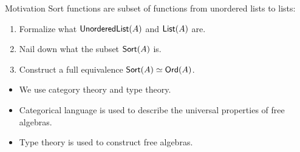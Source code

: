 \documentclass[9pt]{beamer}
\newcommand{\Ord}{\term{Ord}}
\newcommand{\setmtol}{\term{UL2L}}
\newcommand{\Sort}{\term{Sort}}
\newcommand{\otof}{\term{o2f}}
\newcommand{\List}{\term{List}}
\begin{document}
\begin{frame}{Motivation}
  Sort functions are subset of functions from unordered lists to lists:

  \begin{enumerate}
    \item Formalize what \alert{$\operatorname{\mathsf{UnorderedList}}(A)$} and \alert{$\List(A)$} are.
\item Nail down what the \alert{subset $\Sort(A)$} is.
\item Construct a \alert{full equivalence} $\Sort(A) \simeq \Ord(A)$.
  \end{enumerate}

  \begin{itemize}
    \item We use category theory and type theory.
    \item Categorical language is used to describe the universal properties of free algebras.
    \item Type theory is used to construct free algebras.
  \end{itemize}

\end{frame}
\end{document}
